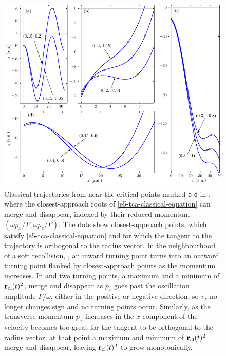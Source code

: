 \begin{figure}[t]
\begin{center}
  \subfloat{\label{f5-sample-trajectories-a}}%
  \subfloat{\label{f5-sample-trajectories-b}}%
  \subfloat{\label{f5-sample-trajectories-c}}
  \subfloat{\label{f5-sample-trajectories-d}}%
  \includegraphics[scale=1]{5-Quantum-orbits/Figures/figure5H.pdf}
\end{center}   
  \caption[
  Classical trajectories near the critical points of the closest-approach surface
  ]{
  Classical trajectories from near the critical points marked \texttt{a}-\texttt{d} in , where the closest-approach roots of \eqref{e5-tca-classical-equation} can merge and disappear, indexed by their reduced momentum $(\omega p_x/F,\omega p_z/F)$. The dots show closest-approach points, which satisfy \eqref{e5-tca-classical-equation} and for which the tangent to the trajectory is orthogonal to the radius vector.
  In the neighbourhood of a soft recollision, \protect{}, an inward turning point turns into an outward turning point flanked by closest-approach points as the momentum increases.
  In \protect{} and \protect{} two turning points, a maximum and a minimum of $\vb{r}_{\mathrm{cl}}(t)^2$, merge and disappear as $p_z$ goes past the oscillation amplitude $F/\omega$, either in the positive \protect{} or negative \protect{} direction, so $v_z$ no longer changes sign and no turning points occur.
  Similarly, as the transverse momentum $p_x$ increases in \protect{} the $x$ component of the velocity becomes too great for the tangent to be orthogonal to the radius vector; at that point a maximum and minimum of $\vb{r}_{\mathrm{cl}}(t)^2$ merge and disappear, leaving $\vb{r}_{\mathrm{cl}}(t)^2$ to grow monotonically.
  }
  \label{f5-sample-trajectories}
\end{figure}


